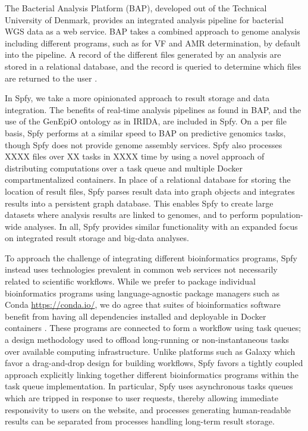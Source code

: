 \documentclass[a4,center,fleqn]{NAR}
\begin{document}
The Bacterial Analysis Platform (BAP), developed out of the Technical University of Denmark, provides an integrated analysis pipeline for bacterial WGS data as a web service.
BAP takes a combined approach to genome analysis including different programs, such as for VF and AMR determination, by default into the pipeline.
A record of the different files generated by an analysis are stored in a relational database, and the record is queried to determine which files are returned to the user \citep{thomsen2016bacterial}.

In Spfy, we take a more opinionated approach to result storage and data integration. The benefits of real-time analysis pipelines as found in BAP, and the use of the GenEpiO ontology as in IRIDA, are included in Spfy.
On a per file basis, Spfy performs at a similar speed to BAP on predictive genomics tasks, though Spfy does not provide genome assembly services.
Spfy also processes XXXX files over XX tasks in XXXX time by using a novel approach of distributing computations over a task queue and multiple Docker compartmentalized containers.
In place of a relational database for storing the location of result files, Spfy parses result data into graph objects and integrates results into a persistent graph database.
This enables Spfy to create large datasets where analysis results are linked to genomes, and to perform population-wide analyses. In all, Spfy provides similar functionality with an expanded focus on integrated result storage and big-data analyses.

To approach the challenge of integrating different bioinformatics programs, Spfy instead uses technologies prevalent in common web services not necessarily related to scientific workflows.
While we prefer to package individual bioinformatics programs using language-agnostic package managers such as Conda \url{https://conda.io/}, we do agree that suites of bioinformatics software benefit from having all dependencies installed and deployable in Docker containers \citep{di2015impact}.
These programs are connected to form a workflow using task queues; a design methodology used to offload long-running or non-instantaneous tasks over available computing infrastructure.
Unlike platforms such as Galaxy which favor a drag-and-drop design for building workflows, Spfy favors a tightly coupled approach explicitly linking together different bioinformatics programs within the task queue implementation.
In particular, Spfy uses asynchronous tasks queues which are tripped in response to user requests, thereby allowing immediate responsivity to users on the website, and processes generating human-readable results can be separated from processes handling long-term result storage.
\end{document}
